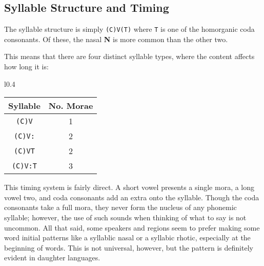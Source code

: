   \subsection{Syllable Structure and Timing}
  The syllable structure is simply \texttt{(C)V(T)} where \texttt{T} is one of the homorganic coda consonants. Of these, the nasal \textbf{N} is more common than the other two.\par
  This means that there are four distinct syllable types, where the content affects how long it is:\par
  \vertspace
  \begin{wrapfigure}{l}{0.4\textwidth}
    \begin{tabular}{|c|c|}
      \hline
      Syllable        & No. Morae \\ \hline \hline
      \texttt{(C)V}   & 1         \\
      \texttt{(C)V:}  & 2         \\
      \texttt{(C)VT}  & 2         \\ 
      \texttt{(C)V:T} & 3         \\ \hline
    \end{tabular}
  \end{wrapfigure} 
  This timing system is fairly direct. A short vowel presents a single mora, a long vowel two, and coda consonants add an extra onto the syllable. Though the coda consonants take a full mora, they never form the nucleus of any phonemic syllable; however, the use of such sounds when thinking of what to say is not uncommon. All that said, some speakers and regions seem to prefer making some word initial patterns like  a syllablic nasal or  a syllabic rhotic, especially at the beginning of words. This is not universal, however, but the pattern is definitely evident in daughter languages.\par

